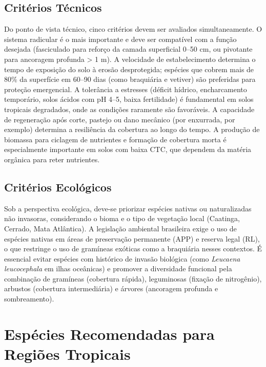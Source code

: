 \documentclass[
  portuguese,
  11pt,
  a4paper,
  open=any]{scrbook}
\begin{document}
\subsection{Critérios Técnicos}\label{crituxe9rios-tuxe9cnicos}

Do ponto de vista técnico, cinco critérios devem ser avaliados
simultaneamente. O sistema radicular é o mais importante e deve ser
compatível com a função desejada (fasciculado para reforço da camada
superficial 0--50 cm, ou pivotante para ancoragem profunda
\textgreater{} 1 m). A velocidade de estabelecimento determina o tempo
de exposição do solo à erosão desprotegida; espécies que cobrem mais de
80\% da superfície em 60--90 dias (como braquiária e vetiver) são
preferidas para proteção emergencial. A tolerância a estresses (déficit
hídrico, encharcamento temporário, solos ácidos com pH 4--5, baixa
fertilidade) é fundamental em solos tropicais degradados, onde as
condições raramente são favoráveis. A capacidade de regeneração após
corte, pastejo ou dano mecânico (por enxurrada, por exemplo) determina a
resiliência da cobertura ao longo do tempo. A produção de biomassa para
ciclagem de nutrientes e formação de cobertura morta é especialmente
importante em solos com baixa CTC, que dependem da matéria orgânica para
reter nutrientes.

\subsection{Critérios Ecológicos}\label{crituxe9rios-ecoluxf3gicos}

Sob a perspectiva ecológica, deve-se priorizar espécies nativas ou
naturalizadas não invasoras, considerando o bioma e o tipo de vegetação
local (Caatinga, Cerrado, Mata Atlântica). A legislação ambiental
brasileira exige o uso de espécies nativas em áreas de preservação
permanente (APP) e reserva legal (RL), o que restringe o uso de
gramíneas exóticas como a braquiária nesses contextos. É essencial
evitar espécies com histórico de invasão biológica (como \emph{Leucaena
leucocephala} em ilhas oceânicas) e promover a diversidade funcional
pela combinação de gramíneas (cobertura rápida), leguminosas (fixação de
nitrogênio), arbustos (cobertura intermediária) e árvores (ancoragem
profunda e sombreamento).

\section{Espécies Recomendadas para Regiões
Tropicais}\label{espuxe9cies-recomendadas-para-regiuxf5es-tropicais}
\end{document}
